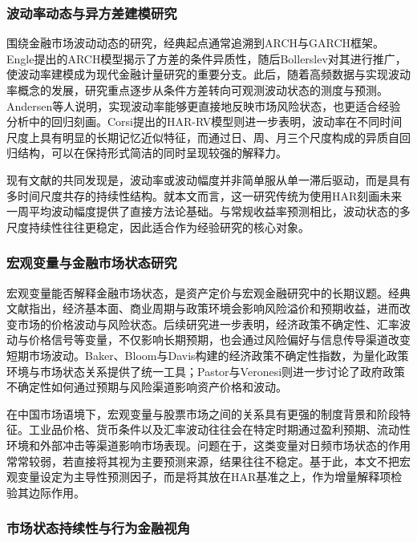 \subsubsection{波动率动态与异方差建模研究}

围绕金融市场波动动态的研究，经典起点通常追溯到ARCH与GARCH框架。Engle提出的ARCH模型揭示了方差的条件异质性，随后Bollerslev对其进行推广，使波动率建模成为现代金融计量研究的重要分支\cite{engle1982,bollerslev1986}。此后，随着高频数据与实现波动率概念的发展，研究重点逐步从条件方差转向可观测波动状态的测度与预测。Andersen等人说明，实现波动率能够更直接地反映市场风险状态，也更适合经验分析中的回归刻画\cite{andersen2003}。Corsi提出的HAR-RV模型则进一步表明，波动率在不同时间尺度上具有明显的长期记忆近似特征，而通过日、周、月三个尺度构成的异质自回归结构，可以在保持形式简洁的同时呈现较强的解释力\cite{corsi2009}。

现有文献的共同发现是，波动率或波动幅度并非简单服从单一滞后驱动，而是具有多时间尺度共存的持续性结构。就本文而言，这一研究传统为使用HAR刻画未来一周平均波动幅度提供了直接方法论基础。与常规收益率预测相比，波动状态的多尺度持续性往往更稳定，因此适合作为经验研究的核心对象。

\subsubsection{宏观变量与金融市场状态研究}

宏观变量能否解释金融市场状态，是资产定价与宏观金融研究中的长期议题。经典文献指出，经济基本面、商业周期与政策环境会影响风险溢价和预期收益，进而改变市场的价格波动与风险状态。后续研究进一步表明，经济政策不确定性、汇率波动与价格信号等变量，不仅影响长期预期，也会通过风险偏好与信息传导渠道改变短期市场波动。Baker、Bloom与Davis构建的经济政策不确定性指数，为量化政策环境与市场状态关系提供了统一工具\cite{baker2016}；Pastor与Veronesi则进一步讨论了政府政策不确定性如何通过预期与风险渠道影响资产价格和波动\cite{pastor2012}。

在中国市场语境下，宏观变量与股票市场之间的关系具有更强的制度背景和阶段特征。工业品价格、货币条件以及汇率波动往往会在特定时期通过盈利预期、流动性环境和外部冲击等渠道影响市场表现。问题在于，这类变量对日频市场状态的作用常常较弱，若直接将其视为主要预测来源，结果往往不稳定。基于此，本文不把宏观变量设定为主导性预测因子，而是将其放在HAR基准之上，作为增量解释项检验其边际作用。

\subsubsection{市场状态持续性与行为金融视角}

